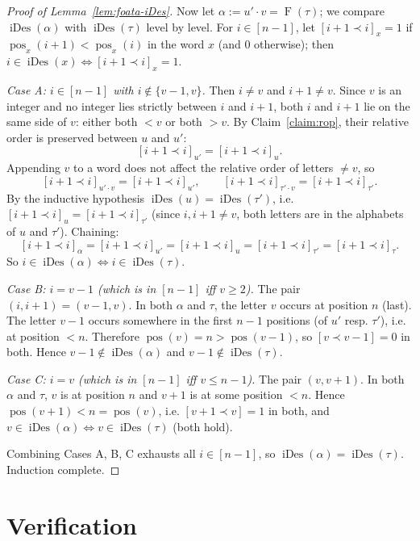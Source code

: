 \documentclass[11pt]{article}
\theoremstyle{definition}
\DeclareMathOperator{\iDes}{iDes}
\DeclareMathOperator{\pos}{pos}
\newcommand{\Foata}{\operatorname{F}}
\begin{document}
\begin{proof}[Proof of Lemma~\ref{lem:foata-iDes}]
Now let $\alpha := u' \cdot v = \Foata(\tau)$; we compare $\iDes(\alpha)$ with
$\iDes(\tau)$ level by level.  For $i \in [n-1]$, let $[i+1 \prec i]_x = 1$
if $\pos_x(i+1) < \pos_x(i)$ in the word $x$ (and $0$ otherwise); then
$i \in \iDes(x) \iff [i+1 \prec i]_x = 1$.

\emph{Case A: $i \in [n-1]$ with $i \notin \{v-1, v\}$.}
Then $i \neq v$ and $i+1 \neq v$.  Since $v$ is an integer and no integer lies
strictly between $i$ and $i+1$, both $i$ and $i+1$ lie on the same side of
$v$: either both $< v$ or both $> v$.  By Claim~\ref{claim:rop}, their
relative order is preserved between $u$ and $u'$:
\[
    [i+1 \prec i]_{u'} = [i+1 \prec i]_u.
\]
Appending $v$ to a word does not affect the relative order of letters
$\neq v$, so
\[
    [i+1 \prec i]_{u' \cdot v} = [i+1 \prec i]_{u'}, \qquad
    [i+1 \prec i]_{\tau' \cdot v} = [i+1 \prec i]_{\tau'}.
\]
By the inductive hypothesis $\iDes(u) = \iDes(\tau')$, i.e.
$[i+1 \prec i]_u = [i+1 \prec i]_{\tau'}$ (since $i, i+1 \neq v$, both letters
are in the alphabets of $u$ and $\tau'$).  Chaining:
\[
    [i+1 \prec i]_\alpha = [i+1 \prec i]_{u'} = [i+1 \prec i]_u
      = [i+1 \prec i]_{\tau'} = [i+1 \prec i]_\tau.
\]
So $i \in \iDes(\alpha) \iff i \in \iDes(\tau)$.

\emph{Case B: $i = v-1$ (which is in $[n-1]$ iff $v \ge 2$).}
The pair $(i, i+1) = (v-1, v)$.  In both $\alpha$ and $\tau$, the letter $v$
occurs at position $n$ (last).  The letter $v-1$ occurs somewhere in the
first $n-1$ positions (of $u'$ resp. $\tau'$), i.e. at position $< n$.
Therefore $\pos(v) = n > \pos(v-1)$, so $[v \prec v-1] = 0$ in both.  Hence
$v-1 \notin \iDes(\alpha)$ and $v-1 \notin \iDes(\tau)$.

\emph{Case C: $i = v$ (which is in $[n-1]$ iff $v \le n-1$).}
The pair $(v, v+1)$.  In both $\alpha$ and $\tau$, $v$ is at position $n$
and $v+1$ is at some position $< n$.  Hence $\pos(v+1) < n = \pos(v)$, i.e.
$[v+1 \prec v] = 1$ in both, and $v \in \iDes(\alpha) \iff v \in \iDes(\tau)$
(both hold).

Combining Cases A, B, C exhausts all $i \in [n-1]$, so $\iDes(\alpha) =
\iDes(\tau)$.  Induction complete.
\end{proof}

\section{Verification}
\end{document}
